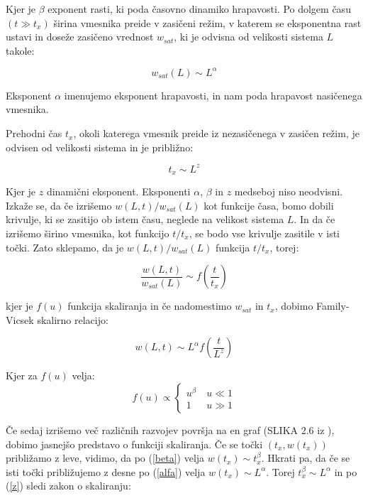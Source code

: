 \documentclass[a4paper, oneside, 12pt]{book}
\begin{document}
        Kjer je $\beta$ exponent rasti, ki poda časovno dinamiko hrapavosti.
        Po dolgem času $(t \gg t_x)$ širina vmesnika preide v zasičeni režim, v katerem se eksponentna rast ustavi in doseže zasičeno vrednost $w_{sat}$, ki je odvisna od velikosti sistema $L$ takole:

        \begin{equation}
          w_{sat}(L) \sim L^\alpha
          \label{alfa}
        \end{equation}

        Eksponent $\alpha$ imenujemo eksponent hrapavosti, in nam poda hrapavost nasičenega vmesnika.

        Prehodni čas $t_x$, okoli katerega vmesnik preide iz nezasičenega v zasičen režim, je odvisen od velikosti sistema in je približno:

        \begin{equation}
          t_x \sim L^z
          \label{z}
        \end{equation}

        Kjer je $z$ dinamični eksponent.
        Eksponenti $\alpha$, $\beta$ in $z$ medseboj niso neodvisni.
        Izkaže se, da če izrišemo $w(L,t)/w_{sat}(L)$ kot funkcije časa, bomo dobili krivulje, ki se zasitijo ob istem času, neglede na velikost sistema $L$.
        In da če izrišemo širino vmesnika, kot funkcijo $t/t_x$, se bodo vse krivulje zasitile v isti točki.
        Zato sklepamo, da je $w(L,t)/w_{sat}(L)$ funkcija $t/t_x$, torej:

        \begin{equation}
          \frac{w(L,t)}{w_{sat}(L)} \sim f(\frac{t}{t_x})
        \end{equation}

        kjer je $f(u)$ funkcija skaliranja in če nadomestimo $w_{sat}$ in $t_x$, dobimo Family-Vicsek skalirno relacijo:

        \begin{equation}
          w(L,t) \sim L^\alpha f(\frac{t}{L^z})
          \label{family-vicsek}
        \end{equation}

        Kjer za $f(u)$ velja:
        \[
          f(u) \propto \left \{ \begin{array}{lr} u^{\beta} & \ u\ll 1 \\
            1 & \ u\gg1\end{array} \right. \]

            Če sedaj izrišemo več različnih razvojev površja na en graf (SLIKA 2.6 iz \cite{barabasi1995fractal} ), dobimo jasnejšo predstavo o funkciji skaliranja. Če se točki $(t_x,w(t_x))$ približamo z leve, vidimo, da po (\ref{beta}) velja $w(t_x) \sim t_x^\beta$. Hkrati pa, da če se isti točki približujemo z desne po (\ref{alfa}) velja $w(t_x) \sim L^\alpha$. Torej $t_x^\beta \sim L^\alpha$ in po (\ref{z}) sledi zakon o skaliranju:
\end{document}
